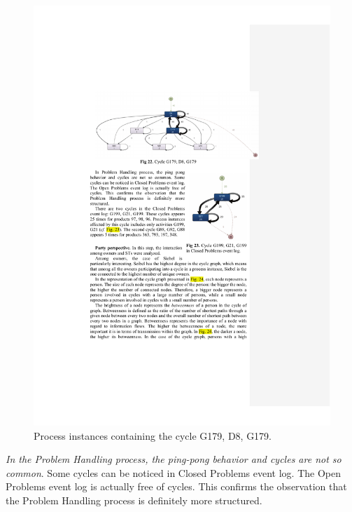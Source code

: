 \documentclass[lnbip]{svmultln}
\begin{document}
\begin{figure}
  \begin{center}
    \includegraphics[width=\textwidth]{"figs/pic 24"}
  \end{center}
  \caption{Process instances containing the cycle G179, D8, G179.}
  \label{fig:cycleG179D8G179}
\end{figure}


\emph{In the Problem Handling process, the ping-pong behavior and cycles are not so common}. Some cycles can be noticed in Closed Problems event log. The Open Problems event log is actually free of cycles. This confirms the observation that the Problem Handling process is definitely more structured.
\end{document}
